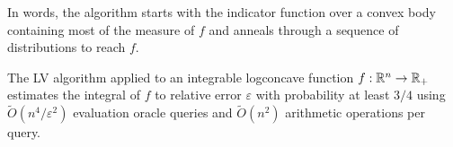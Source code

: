 In words, the algorithm starts with the indicator function over a
convex body containing most of the measure of $f$ and anneals through
a sequence of distributions to reach $f$.
\begin{thm}
The LV algorithm applied to an integrable logconcave function $f:\mathbb{R}^{n}\rightarrow\mathbb{R}_{+}$
estimates the integral of $f$ to relative error $\varepsilon$ with
probability at least $3/4$ using $\widetilde{O}(n^{4}/\varepsilon^{2})$
evaluation oracle queries and $\widetilde{O}(n^{2})$ arithmetic operations
per query.%
\end{thm}


